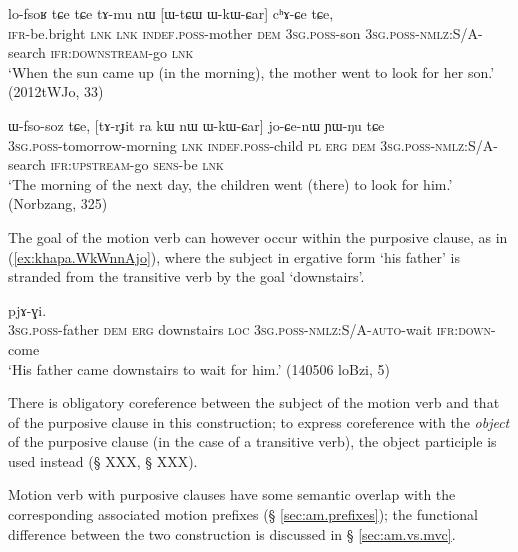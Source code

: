 \begin{exe}
\ex \label{ex:WkWCar.chACe}
 \gll lo-fsoʁ tɕe tɕe tɤ-mu nɯ [ɯ-tɕɯ ɯ-kɯ-ɕar] cʰɤ-ɕe tɕe,\\
 \textsc{ifr}-be.bright \textsc{lnk} \textsc{lnk} \textsc{indef}.\textsc{poss}-mother \textsc{dem} \textsc{3sg}.\textsc{poss}-son \textsc{3sg}.\textsc{poss}-\textsc{nmlz}:S/A-search \textsc{ifr}:\textsc{downstream}-go \textsc{lnk} \\
\glt `When the sun came up (in the morning), the mother went to look for her son.' (2012tWJo, 33)
\end{exe}

\begin{exe}
\ex \label{ex:WkWCar.loCenW}
 \gll ɯ-fso-soz tɕe, [tɤ-rɟit ra kɯ nɯ ɯ-kɯ-ɕar] jo-ɕe-nɯ ɲɯ-ŋu tɕe \\
 \textsc{3sg}.\textsc{poss}-tomorrow-morning \textsc{lnk} \textsc{indef}.\textsc{poss}-child \textsc{pl} \textsc{erg} \textsc{dem} \textsc{3sg}.\textsc{poss}-\textsc{nmlz}:S/A-search \textsc{ifr}:\textsc{upstream}-go \textsc{sens}-be \textsc{lnk} \\
\glt  `The morning of the next day, the children went (there) to look for him.'  (Norbzang, 325)
\end{exe}

The goal of the motion verb can however occur within the purposive clause, as in (\ref{ex:khapa.WkWnnAjo}), where the subject in ergative form  `his father' is stranded from the transitive verb  by the goal  `downstairs'.

\begin{exe}
\ex \label{ex:khapa.WkWnnAjo}
  pjɤ-ɣi.  \\
  \textsc{3sg}.\textsc{poss}-father \textsc{dem} \textsc{erg} downstairs \textsc{loc}    \textsc{3sg}.\textsc{poss}-\textsc{nmlz}:S/A-\textsc{auto}-wait \textsc{ifr}:\textsc{down}-come \\
  \glt `His father came downstairs to wait for him.' (140506 loBzi, 5)
\end{exe}

There is obligatory coreference between the subject of the motion verb and that of the purposive clause in this construction; to express coreference with the \textit{object} of the purposive clause (in the case of a transitive verb), the object participle is used instead (§ XXX, § XXX). 

Motion verb with purposive clauses have some semantic overlap with the corresponding associated motion prefixes (§ \ref{sec:am.prefixes}); the functional difference between the two construction is discussed in § \ref{sec:am.vs.mvc}.

